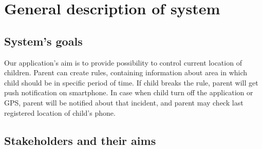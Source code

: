 \documentclass{sprawozdanie-agh}
\begin{document}
   


	\stronatytulowa{}

	\section{General description of system}

		\subsection{System's goals}

			Our application's aim is to provide possibility to control current location of children. Parent can create rules, containing information about area in which child should be in specific period of time. If child breaks the rule, parent will get push notification on smartphone. In case when child turn off the application or GPS, parent will be notified about that incident, and parent may check last registered location of child's phone.

		\subsection{Stakeholders and their aims}
\end{document}
